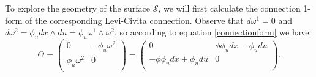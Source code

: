 \documentclass{article}
\theoremstyle{remark}
\theoremstyle{definition}
\begin{document}


To explore the geometry of the surface $\mathcal{S}$, we will first calculate the connection 1-form of the corresponding Levi-Civita connection. Observe that $d \omega^1=0$ and ${d\omega^2=\phi_u dx\wedge du=\phi_u \omega^1\wedge \omega^2}$, so according to equation \eqref{connectionform} we have:
$$
\Theta=
\begin{pmatrix}
0&-\phi_u \omega^2\\ 
\phi_u \omega^2&0\\
\end{pmatrix}
=
\begin{pmatrix}
0&\phi \phi_u dx -\phi_u du\\ 
-\phi \phi_u dx + \phi_u du&0\\
\end{pmatrix}.
$$
\end{document}
